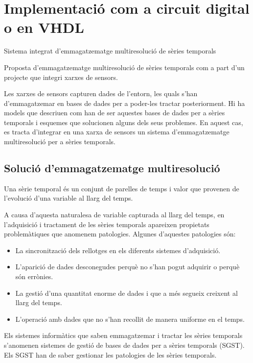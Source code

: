 \chapter{Implementació com a circuit digital o en VHDL}




Sistema integrat d'emmagatzematge multiresolució de sèries temporals

  Proposta d'emmagatzematge multiresolució de sèries temporals com a
  part d'un projecte que integri xarxes de sensors.



Les xarxes de sensors capturen dades de l'entorn, les quals s'han
d'emmagatzemar en bases de dades per a poder-les tractar
posteriorment. Hi ha models que descriuen com han de ser aquestes
bases de dades per a sèries temporals i esquemes que solucionen alguns
dels seus problemes. En aquest cas, es tracta d'integrar en una xarxa
de sensors un sistema d'emmagatzematge multiresolució per a sèries
temporals.




\section{Solució d'emmagatzematge multiresolució}

Una sèrie temporal és un conjunt de parelles de temps i valor que
provenen de l'evolució d'una variable al llarg del temps. 

A causa d'aquesta naturalesa de variable capturada al llarg del temps,
en l'adquisició i tractament de les sèries temporals apareixen
propietats problemàtiques que anomenem patologies.
Algunes d'aquestes patologies són:
\begin{itemize}
\item La sincronització dels rellotges en els diferents sistemes
  d'adquisició.
\item L'aparició de dades desconegudes perquè no s'han pogut adquirir
  o perquè són errònies.
\item La gestió d'una quantitat enorme de dades i que a més segueix
  creixent al llarg del temps.
\item L'operació amb dades que no s'han recollit de manera uniforme en
  el temps.
\end{itemize}


Els sistemes informàtics que saben emmagatzemar i tractar les sèries
temporals s'anomenen sistemes de gestió de bases de dades per a sèries
temporals (SGST). Els SGST han de saber gestionar les patologies de
les sèries temporals. 

